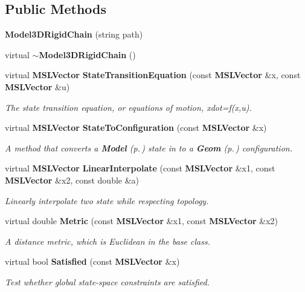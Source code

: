 \subsection*{Public Methods}
\begin{CompactItemize}
\item 
{\bf Model3DRigid\-Chain} (string path)
\item 
virtual {\bf $\sim$Model3DRigid\-Chain} ()
\item 
virtual {\bf MSLVector} {\bf State\-Transition\-Equation} (const {\bf MSLVector} \&x, const {\bf MSLVector} \&u)
\begin{CompactList}\small\item\em The state transition equation, or equations of motion, xdot=f(x,u).\item\end{CompactList}\item 
virtual {\bf MSLVector} {\bf State\-To\-Configuration} (const {\bf MSLVector} \&x)
\begin{CompactList}\small\item\em A method that converts a {\bf Model} {\rm (p.\,\pageref{class_Model})} state in to a {\bf Geom} {\rm (p.\,\pageref{class_Geom})} configuration.\item\end{CompactList}\item 
virtual {\bf MSLVector} {\bf Linear\-Interpolate} (const {\bf MSLVector} \&x1, const {\bf MSLVector} \&x2, const double \&a)
\begin{CompactList}\small\item\em Linearly interpolate two state while respecting topology.\item\end{CompactList}\item 
virtual double {\bf Metric} (const {\bf MSLVector} \&x1, const {\bf MSLVector} \&x2)
\begin{CompactList}\small\item\em A distance metric, which is Euclidean in the base class.\item\end{CompactList}\item 
virtual bool {\bf Satisfied} (const {\bf MSLVector} \&x)
\begin{CompactList}\small\item\em Test whether global state-space constraints are satisfied.\item\end{CompactList}\end{CompactItemize}
